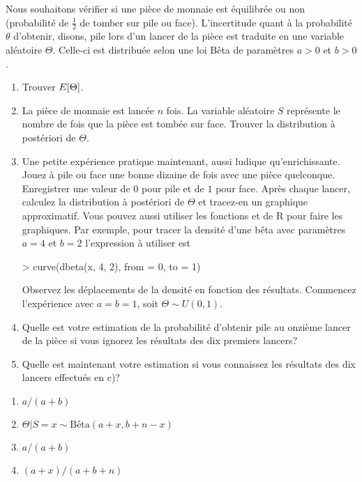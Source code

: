 \begin{exercice}
  Nous souhaitons vérifier si une pièce de monnaie est équilibrée ou
  non (probabilité de $\frac{1}{2}$ de tomber sur pile ou face).
  L'incertitude quant à la probabilité $\theta$ d'obtenir, disons,
  pile lors d'un lancer de la pièce est traduite en une variable
  aléatoire $\Theta$. Celle-ci est distribuée selon une loi Bêta de
  paramètres $a > 0$ et $b > 0$.
  \begin{enumerate}
  \item Trouver $E [ \Theta ]$.
  \item La pièce de monnaie est lancée $n$ fois. La variable aléatoire
    $S$ représente le nombre de fois que la pièce est tombée sur face.
    Trouver la distribution à postériori de $\Theta$.
  \item Une petite expérience pratique maintenant, aussi ludique
    qu'enrichissante. Jouez à pile ou face une bonne dizaine de fois
    avec une pièce quelconque. Enregistrer une valeur de $0$ pour pile
    et de $1$ pour face. Après chaque lancer, calculez la distribution
    à postériori de $\Theta$ et tracez-en un graphique approximatif.
    Vous pouvez aussi utiliser les fonctions  et
     de R pour faire les graphiques. Par exemple, pour
    tracer la densité d'une bêta avec paramètres $a = 4$ et $b = 2$
    l'expression à utiliser est
\begin{Schunk}
\begin{Sinput}
> curve(dbeta(x, 4, 2), from = 0, to = 1)
\end{Sinput}
\end{Schunk}
    Observez les déplacements de la densité en fonction des résultats.
    Commencez l'expérience avec $a = b = 1$, soit $\Theta
    \sim U(0, 1)$.
  \item Quelle est votre estimation de la probabilité d'obtenir pile
    au onzième lancer de la pièce si vous ignorez les résultats des
    dix premiers lancers?
  \item Quelle est maintenant votre estimation si vous connaissez les
    résultats des dix lancers effectués en c)?
  \end{enumerate}
  \begin{rep}
    \begin{enumerate}
    \item $a/(a + b)$
    \item $\Theta|S = x \sim \text{Bêta}(a + x, b + n - x)$
    \item $a/(a + b)$
    \item $(a + x)/(a + b + n)$

\end{enumerate}
\end{rep}
\end{exercice}
